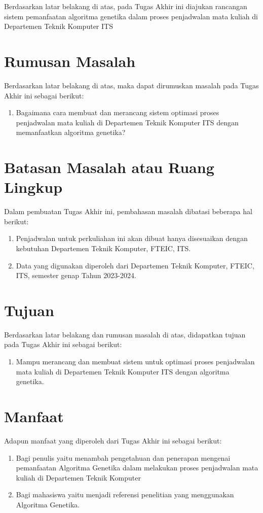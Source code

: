 Berdasarkan latar belakang di atas, pada Tugas Akhir ini diajukan rancangan sistem pemanfaatan algoritma genetika dalam proses penjadwalan mata kuliah di Departemen Teknik Komputer ITS

\section{Rumusan Masalah}

Berdasarkan latar belakang di atas, maka dapat dirumuskan masalah pada Tugas Akhir ini sebagai berikut:
\begin{enumerate}
    \item Bagaimana cara membuat dan merancang sistem optimasi proses penjadwalan mata kuliah di Departemen Teknik Komputer ITS dengan memanfaatkan algoritma genetika?
\end{enumerate}

\section{Batasan Masalah atau Ruang Lingkup}

Dalam pembuatan Tugas Akhir ini, pembahasan masalah dibatasi beberapa hal berikut:
\begin{enumerate}
    \item Penjadwalan untuk perkuliahan ini akan dibuat hanya disesuaikan dengan kebutuhan Departemen Teknik Komputer, FTEIC, ITS.
    \item Data yang digunakan diperoleh dari Departemen Teknik Komputer, FTEIC, ITS, semester genap Tahun 2023-2024.
\end{enumerate}

\section{Tujuan}

Berdasarkan latar belakang dan rumusan masalah di atas, didapatkan tujuan pada Tugas Akhir ini sebagai berikut:
\begin{enumerate}
    \item Mampu merancang dan membuat sistem untuk optimasi proses penjadwalan mata kuliah di Departemen Teknik Komputer ITS dengan algoritma genetika.
\end{enumerate}

\section{Manfaat}

Adapun manfaat yang diperoleh dari Tugas Akhir ini sebagai berikut:
\begin{enumerate}
    \item Bagi penulis yaitu menambah pengetahuan dan penerapan mengenai pemanfaatan Algoritma Genetika dalam melakukan proses penjadwalan mata kuliah di Departemen Teknik Komputer 
    \item Bagi mahasiswa yaitu menjadi referensi penelitian yang menggunakan Algoritma Genetika.
\end{enumerate}
